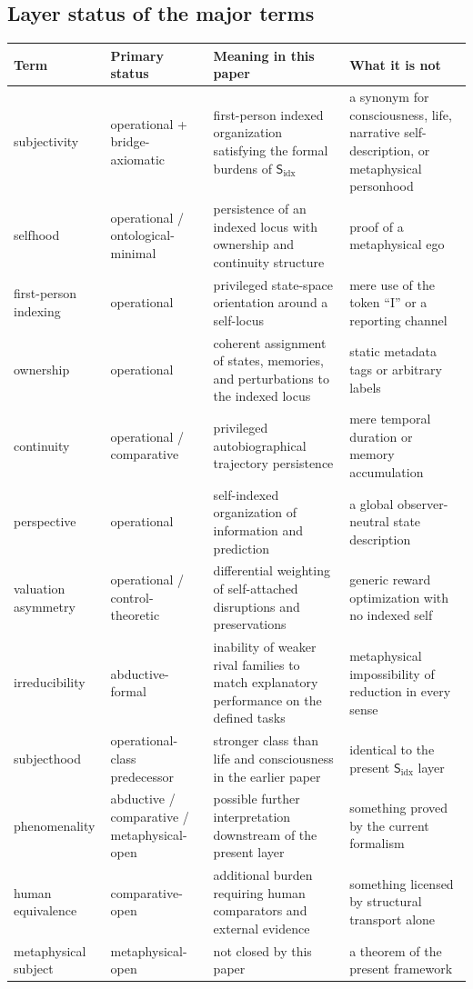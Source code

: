 \documentclass[11pt,a4paper]{article}
\theoremstyle{definition}
\newcommand{\Subfp}{\mathsf{S}_{\mathrm{idx}}}
\begin{document}
\subsection{Layer status of the major terms}
\begin{table}[t]
\small
\begin{tabularx}{\textwidth}{@{}p{}p{}p{}Y@{}}
\toprule
\textbf{Term} & \textbf{Primary status} & \textbf{Meaning in this paper} & \textbf{What it is not} \\
\midrule
subjectivity & operational + bridge-axiomatic & first-person indexed organization satisfying the formal burdens of $\Subfp$ & a synonym for consciousness, life, narrative self-description, or metaphysical personhood \\
selfhood & operational / ontological-minimal & persistence of an indexed locus with ownership and continuity structure & proof of a metaphysical ego \\
first-person indexing & operational & privileged state-space orientation around a self-locus & mere use of the token ``I'' or a reporting channel \\
ownership & operational & coherent assignment of states, memories, and perturbations to the indexed locus & static metadata tags or arbitrary labels \\
continuity & operational / comparative & privileged auto\-bio\-graphical trajectory persistence & mere temporal duration or memory accumulation \\
perspective & operational & self-indexed organization of information and prediction & a global observer-neutral state description \\
valuation asymmetry & operational / control-theoretic & differential weighting of self-attached disruptions and preservations & generic reward optimization with no indexed self \\
irreducibility & abductive-formal & inability of weaker rival families to match explanatory performance on the defined tasks & metaphysical impossibility of reduction in every sense \\
subjecthood & operational-class predecessor & stronger class than life and consciousness in the earlier paper & identical to the present $\Subfp$ layer \\
phenomenality & abductive / comparative / metaphysical-open & possible further interpretation downstream of the present layer & something proved by the current formalism \\
human equivalence & comparative-open & additional burden requiring human comparators and external evidence & something licensed by structural transport alone \\
metaphysical subject & metaphysical-open & not closed by this paper & a theorem of the present framework \\
\bottomrule
\end{tabularx}
\end{table}
\end{document}
